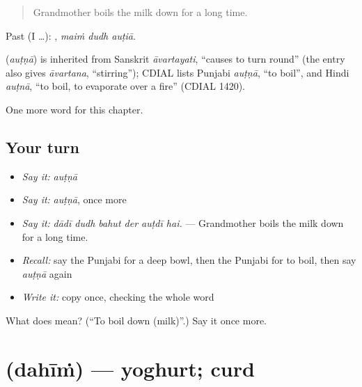 \begin{quote}
Grandmother boils the milk down for a long time.
\end{quote}

Past (I …):   , \emph{maiṁ dudh auṭiā}.

\begin{cousinweb}
\textbf{} (\emph{auṭṇā}) is inherited from Sanskrit \emph{āvartayati}, \textquotedblleft{}causes to turn round\textquotedblright{} (the entry also gives \emph{āvartana}, \textquotedblleft{}stirring\textquotedblright{}); CDIAL lists Punjabi \emph{auṭṇā}, \textquotedblleft{}to boil\textquotedblright{}, and Hindi \emph{auṭnā}, \textquotedblleft{}to boil, to evaporate over a fire\textquotedblright{} (CDIAL 1420).
\end{cousinweb}

\begin{grammarlens}[title={What you've built}]
One more word for this chapter.
\end{grammarlens}

\subsection*{Your turn}
\begin{itemize}
\raggedright
  \item \emph{Say it:} \emph{auṭṇā}
  \item \emph{Say it:} \emph{auṭṇā}, once more
  \item \emph{Say it:} \emph{dādī dudh bahut der auṭdī hai.} — Grandmother boils the milk down for a long time.
  \item \emph{Recall:} say the Punjabi for a deep bowl, then the Punjabi for to boil, then say \emph{auṭṇā} again
  \item \emph{Write it:} copy \textbf{} once, checking the whole word
\end{itemize}

\begin{tcolorbox}[breakable,colback=teal!4,colframe=teal!35!black,title={Before you move on}]
What does  mean? (\textquotedblleft{}To boil down (milk)\textquotedblright{}.) Say it once more.
\end{tcolorbox}
\section[\texorpdfstring{\pa{ਦਹੀਂ} (dahīṁ)}{ਦਹੀਂ (dahīṁ)}]{ (dahīṁ) — yoghurt; curd}

